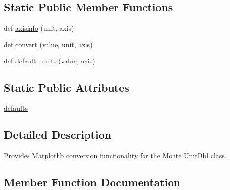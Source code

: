 \subsection*{Static Public Member Functions}
\begin{DoxyCompactItemize}
\item 
def \hyperlink{classmatplotlib_1_1testing_1_1jpl__units_1_1UnitDblConverter_1_1UnitDblConverter_a5bda11423471a23d341cff69d9802c13}{axisinfo} (unit, axis)
\item 
def \hyperlink{classmatplotlib_1_1testing_1_1jpl__units_1_1UnitDblConverter_1_1UnitDblConverter_a707390ddfbdd767d089881fed7d24789}{convert} (value, unit, axis)
\item 
def \hyperlink{classmatplotlib_1_1testing_1_1jpl__units_1_1UnitDblConverter_1_1UnitDblConverter_ae5d98ae934180e68babc1ed9ac038bea}{default\+\_\+units} (value, axis)
\end{DoxyCompactItemize}
\subsection*{Static Public Attributes}
\begin{DoxyCompactItemize}
\item 
\hyperlink{classmatplotlib_1_1testing_1_1jpl__units_1_1UnitDblConverter_1_1UnitDblConverter_a92b73a18b23f3d5dee60ae1410ae4d82}{defaults}
\end{DoxyCompactItemize}


\subsection{Detailed Description}
\begin{DoxyVerb}Provides Matplotlib conversion functionality for the Monte UnitDbl class.
\end{DoxyVerb}
 

\subsection{Member Function Documentation}
\mbox{\label{classmatplotlib_1_1testing_1_1jpl__units_1_1UnitDblConverter_1_1UnitDblConverter_a5bda11423471a23d341cff69d9802c13}} 
